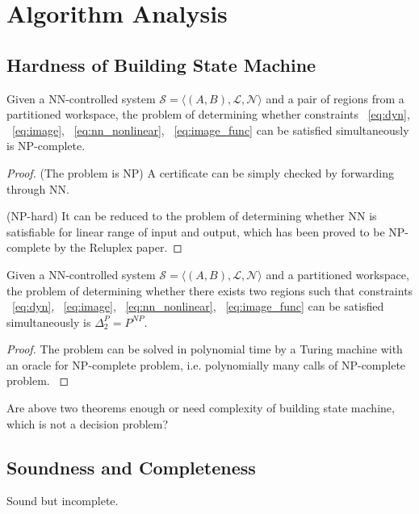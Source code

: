 \section{Algorithm Analysis}

\subsection{Hardness of Building State Machine}

\begin{theorem}
    Given a NN-controlled system 
    $\mathcal{S} = \langle (A, B), \mathcal{L}, \mathcal{N} \rangle$ 
    and a pair of regions from a partitioned workspace, 
    the problem of determining whether constraints
    ~\eqref{eq:dyn}, ~\eqref{eq:image}, ~\eqref{eq:nn_nonlinear}, ~\eqref{eq:image_func}
    can be satisfied simultaneously is NP-complete.
\end{theorem}    

\begin{proof}
    {\color{blue} 
    (The problem is NP) A certificate can be simply checked by forwarding through NN.

    (NP-hard) It can be reduced to the problem of determining whether NN is satisfiable for linear range of input and output, 
    which has been proved to be NP-complete by the Reluplex paper.
    }
\end{proof}


\begin{theorem}
    Given a NN-controlled system 
    $\mathcal{S} = \langle (A, B), \mathcal{L}, \mathcal{N} \rangle$ 
    and a partitioned workspace,
    the problem of determining whether there exists two regions such that constraints
    ~\eqref{eq:dyn}, ~\eqref{eq:image}, ~\eqref{eq:nn_nonlinear}, ~\eqref{eq:image_func}
    can be satisfied simultaneously is $\Delta_2^P = P^{NP}$.
\end{theorem}    

\begin{proof}
    {\color{blue} 
    The problem can be solved in polynomial time by a Turing machine with an oracle for NP-complete problem, 
    i.e. polynomially many calls of NP-complete problem.
    }
\end{proof}    



{\color{blue} Are above two theorems enough or need complexity of building state machine, which is not a decision problem?}


\subsection{Soundness and Completeness}
{\color{blue} Sound but incomplete.}

